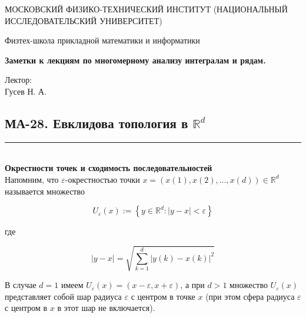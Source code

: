 \documentclass[a4paper,12pt]{article} %
\date{\today}
\newcommand{\HRule}{\rule{\linewidth}{0.5mm}}
\begin{document}
\begin{titlepage}
	\begin{center}
		{\large МОСКОВСКИЙ ФИЗИКО-ТЕХНИЧЕСКИЙ ИНСТИТУТ (НАЦИОНАЛЬНЫЙ ИССЛЕДОВАТЕЛЬСКИЙ УНИВЕРСИТЕТ)}
	\end{center}
	\begin{center}
		{\large Физтех-школа прикладной математики и информатики}
	\end{center}
	
	
	\vspace{6.5cm}
	{\huge
		\begin{center}
			{\bf Заметки к лекциям по многомерному анализу интегралам и рядам.}\\
			
		\end{center}
	}
	\vspace{7cm}
	\begin{flushright}
		{\LARGE Лектор:\\ Гусев Н. А. \\
			\vspace{0.2cm}

			}
	\end{flushright}
	\vspace{8cm}
\end{titlepage}



\tableofcontents
\newpage


\newpage
\begin{LARGE}
  \begin{center}
    \section{МА-28. Евклидова топология в $\mathbb{R}^{d}$ }
  \end{center}
\end{LARGE}
\HRule \\

\textbf{Окрестности точек и сходимость последовательностей}\\
Напомним, что $\varepsilon$-окрестностью точки $x=(x(1), x(2), \ldots, x(d)) \in \mathbb{R}^{d}$ называется множество

$$
U_{\varepsilon}(x):=\left\{y \in \mathbb{R}^{d}:|y-x|<\varepsilon\right\}
$$

где

$$
|y-x|=\sqrt{\sum_{k=1}^{d}|y(k)-x(k)|^{2}}
$$

В случае $d=1$ имеем $U_{\varepsilon}(x)=(x-\varepsilon, x+\varepsilon)$, а при $d>1$ множество $U_{\varepsilon}(x)$ представляет собой шар радиуса $\varepsilon$ с центром в точке $x$ (при этом сфера радиуса $\varepsilon$ с центром в $x$ в этот шар не включается).
\end{document}

